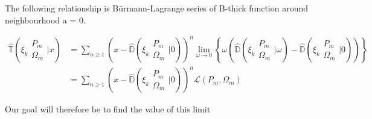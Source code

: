 \begin{conjecture}
        The following relationship is Bürmann-Lagrange series of B-thick function around neighbourhood a = 0.
        
        \begin{align}
                \hat{\mathbb{T}}\left( \xi_k \begin{matrix} P_m \\ \Omega_m \end{matrix}
                \bigg| x \right) &= \sum_{n \geq 1} \left( x - \hat{\mathbb{D}}\left( 
                \xi_k \begin{matrix} P_m \\ \Omega_m \end{matrix} \bigg| 0 \right)\right)^n
                \lim_{\omega \to 0} \left\{\omega\left(\hat{\mathbb{D}}\left( \xi_k 
                \begin{matrix} P_m \\ \Omega_m \end{matrix} \bigg| \omega \right) - 
                \hat{\mathbb{D}}\left( \xi_k \begin{matrix} P_m \\ \Omega_m \end{matrix}
                \bigg| 0 \right)\right)\right\} \\ & = \sum_{n \geq 1} \left( x - 
                \hat{\mathbb{D}}\left( \xi_k \begin{matrix} P_m \\ \Omega_m \end{matrix} 
                \bigg| 0 \right)\right)^n \mathcal{L}(P_m, \Omega_m)
        \end{align}
\end{conjecture}

Our goal will therefore be to find the value of this limit

